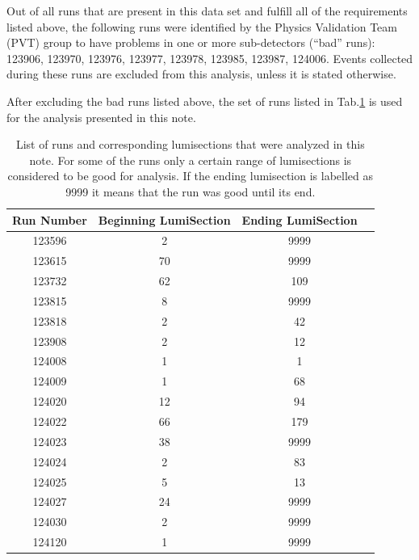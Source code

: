 Out of all runs that are present in this data set and fulfill all
of the requirements listed above, the following runs were identified 
by the Physics Validation Team (PVT) group to have
problems in one or more sub-detectors (``bad'' runs): 123906, 123970, 123976, 123977, 
123978, 123985, 123987, 124006. 
Events collected during these runs are excluded
from this analysis, unless it is stated otherwise.

After excluding the bad runs listed above, the set of runs listed in
Tab.\ref{tab:goodruns} is used for the analysis presented in this
note. 

\begin{table}[h]
  \begin{center}
    \begin{tabular}{|c|c|c|c|}
      \hline
      Run Number      & Beginning LumiSection  & Ending LumiSection   \\\hline\hline
      123596              & 2   & 9999\\ 
      123615              & 70 & 9999\\
      123732              & 62 & 109\\
      123815              & 8   & 9999\\
      123818              & 2   & 42\\
      123908              & 2   & 12\\
      124008              & 1   & 1\\
      124009              & 1   & 68\\
      124020              & 12 & 94\\
      124022              & 66 & 179\\
      124023              & 38 & 9999\\
      124024              & 2   & 83\\
      124025              & 5   & 13\\
      124027              & 24 & 9999\\
      124030              & 2   & 9999\\
      124120              & 1   & 9999\\
      \hline    
    \end{tabular}
    \caption{List of runs and corresponding lumisections that were analyzed in this note. For some of
      the runs only a certain range of lumisections is considered to be
      good for analysis. If the ending lumisection is labelled as 9999 it
      means that the run was good until its end.}
    \label{tab:goodruns}
  \end{center}
\end{table}

